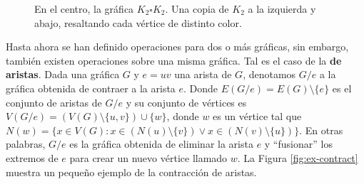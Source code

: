 \begin{figure}[ht!]
    \centering
        \caption{En el centro, la gr\'afica $K_2 \square K_2$. Una copia de
        $K_2$ a la izquierda y abajo, resaltando cada v\'ertice de distinto
        color.}
        \label{fig:ex-cartesiano}
    \end{figure}

Hasta ahora se han definido operaciones para dos o m\'as gr\'aficas, sin
embargo, tambi\'en existen operaciones sobre una misma gr\'afica. Tal es el caso
de la  \textbf{de aristas}. Dada una gr\'afica
$G$ y $e=uv$ una arista de $G$, denotamos $G/e$ a la gr\'afica obtenida de
contraer a la arista $e$. Donde $E(G/e)=E(G) \setminus \{e\}$ es el conjunto de
aristas de $G/e$ y su conjunto de v\'ertices es $V(G/e)=(V(G)\setminus \{u,v\})
\cup \{w\}$, donde $w$ es un v\'ertice tal que $N(w)=\{x \in V(G) \colon x \in
(N(u)\setminus \{v\}) \lor x \in (N(v) \setminus \{u\})\}$. En otras palabras,
$G/e$ es la gr\'afica obtenida de eliminar la arista $e$ y ``fusionar'' los
extremos de $e$ para crear un nuevo v\'ertice llamado $w$. La Figura
\ref{fig:ex-contract} muestra un peque\~{n}o ejemplo de la contracci\'on de
aristas.

